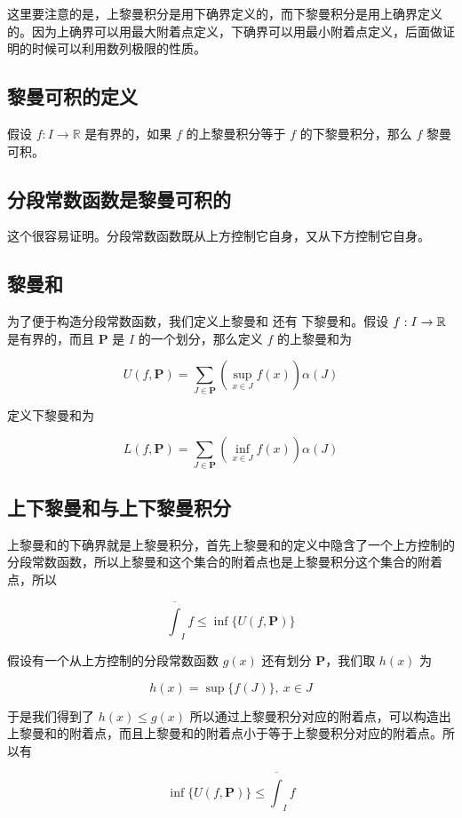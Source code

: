 这里要注意的是，上黎曼积分是用下确界定义的，而下黎曼积分是用上确界定义的。因为上确界可以用最大附着点定义，下确界可以用最小附着点定义，后面做证明的时候可以利用数列极限的性质。


\subsection{黎曼可积的定义}

假设 $f: I \to \mathbb{R}$ 是有界的，如果 $f$ 的上黎曼积分等于 $f$ 的下黎曼积分，那么 $f$ 黎曼可积。


\subsection{分段常数函数是黎曼可积的}

这个很容易证明。分段常数函数既从上方控制它自身，又从下方控制它自身。

\subsection{黎曼和}

为了便于构造分段常数函数，我们定义上黎曼和 还有 下黎曼和。假设 $f: I \to \mathbb{R}$ 是有界的，而且 $\mathbf{P}$ 是 $I$ 的一个划分，那么定义 $f$ 的上黎曼和为

\[
    U(f, \mathbf{P}) = \sum_{J \in \mathbf{P}} (\sup_{x \in J}f(x)) \alpha(J)
\]

定义下黎曼和为

\[
    L(f, \mathbf{P}) = \sum_{J \in \mathbf{P}} (\inf_{x \in J}f(x)) \alpha(J)
\]

\subsection{上下黎曼和与上下黎曼积分}

上黎曼和的下确界就是上黎曼积分，首先上黎曼和的定义中隐含了一个上方控制的分段常数函数，所以上黎曼和这个集合的附着点也是上黎曼积分这个集合的附着点，所以

\[
    \overline{\int}_I f \le \inf \{ U(f, \mathbf{P}) \}
\]

假设有一个从上方控制的分段常数函数 $g(x)$ 还有划分 $\mathbf{P}$，我们取 $h(x)$ 为

\[
    h(x) = \sup \{ f(J) \}, \: x \in J
\]

于是我们得到了 $h(x) \le g(x)$ 所以通过上黎曼积分对应的附着点，可以构造出上黎曼和的附着点，而且上黎曼和的附着点小于等于上黎曼积分对应的附着点。所以有

\[
 \inf \{ U(f, \mathbf{P}) \}   \le  \overline{\int}_I f
\]

